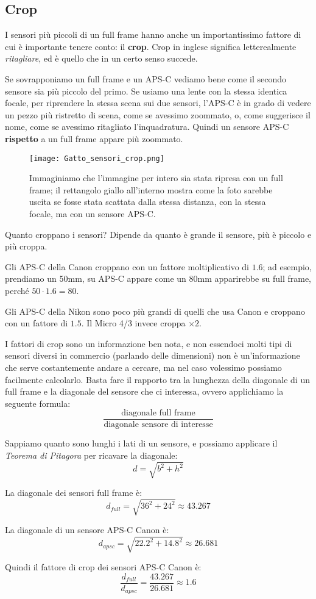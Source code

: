 \subsection{Crop} \label{subsec:crop}
I sensori più piccoli di un full frame hanno anche un importantissimo fattore di cui è importante tenere conto: il \textbf{crop}.
Crop in inglese significa letterealmente \textit{ritagliare}, ed è quello che in un certo senso succede.

Se sovrapponiamo un full frame e un APS-C vediamo bene come il secondo sensore sia più piccolo del primo. Se usiamo una lente con la stessa identica focale, per riprendere la stessa scena sui due sensori, l'APS-C è in grado di vedere un pezzo più ristretto di scena, come se avessimo zoommato, o, come suggerisce il nome, come se avessimo ritagliato l'inquadratura. Quindi un sensore APS-C \textbf{rispetto} a un full frame appare più zoommato.

\begin{figure}[h]
    \texttt{[image: Gatto\_sensori\_crop.png]}
    \caption{Immaginiamo che l'immagine per intero sia stata ripresa con un full frame; il rettangolo giallo all'interno mostra come la foto sarebbe uscita se fosse stata scattata dalla stessa distanza, con la stessa focale, ma con un sensore APS-C.}
\end{figure}

Quanto croppano i sensori? Dipende da quanto è grande il sensore, più è piccolo e più croppa.

Gli APS-C della Canon croppano con un fattore moltiplicativo di $1.6$; ad esempio, prendiamo un 50mm, su APS-C appare come un 80mm apparirebbe su full frame, perché $50 \cdot 1.6 = 80$.

Gli APS-C della Nikon sono poco più grandi di quelli che usa Canon e croppano con un fattore di $1.5$. Il Micro 4/3 invece croppa $\times 2$.

I fattori di crop sono un informazione ben nota, e non essendoci molti tipi di sensori diversi in commercio (parlando delle dimensioni) non è un'informazione che serve costantemente andare a cercare, ma nel caso volessimo possiamo
facilmente calcolarlo. Basta fare il rapporto tra la lunghezza della diagonale di un full frame e la diagonale del sensore che ci interessa, ovvero applichiamo la seguente formula:
\[ \dfrac{\text{diagonale full frame}}{\text{diagonale sensore di interesse}} \]

Sappiamo quanto sono lunghi i lati di un sensore, e possiamo applicare il \textit{Teorema di Pitagora} per ricavare la diagonale:
\[ d = \sqrt{b^2 + h^2} \]

La diagonale dei sensori full frame è:
\[ d_{full} = \sqrt{36^2 + 24^2} \approx 43.267 \]

La diagonale di un sensore APS-C Canon è:
\[ d_{apsc} = \sqrt{22.2^2 + 14.8^2} \approx 26.681 \]

Quindi il fattore di crop dei sensori APS-C Canon è:
\[ \dfrac{d_{full}}{d_{apsc}} = \dfrac{43.267}{26.681} \approx 1.6 \]